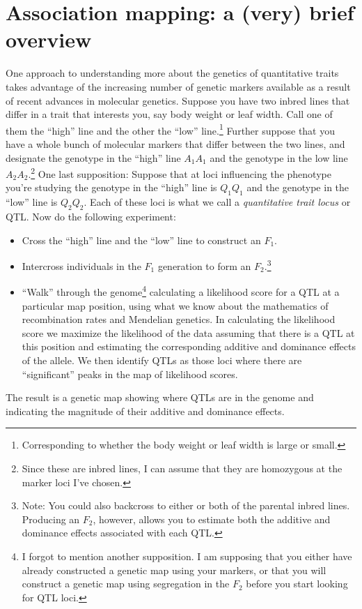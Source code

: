 \chapter{Association mapping: a (very) brief overview}

One approach to understanding more about the genetics of quantitative
traits takes advantage of the increasing number of genetic markers
available as a result of recent advances in molecular
genetics. Suppose you have two inbred lines that differ in a trait
that interests you, say body weight or leaf width. Call one of them
the ``high'' line and the other the ``low''
line.\footnote{Corresponding to whether the body weight or leaf width
  is large or small.} Further suppose that you have a whole bunch of
molecular markers that differ between the two lines, and designate the
genotype in the ``high'' line $A_1A_1$ and the genotype in the low
line $A_2A_2$.\footnote{Since these are inbred lines, I can assume
  that they are homozygous at the marker loci I've chosen.} One last
supposition: Suppose that at loci influencing the phenotype you're
studying the genotype in the ``high'' line is $Q_1Q_1$ and the
genotype in the ``low'' line is $Q_2Q_2$. Each of these loci is what
we call a {\it quantitative trait locus\/} or QTL. Now do the following experiment:

\begin{itemize}

\item Cross the ``high'' line and the ``low'' line to construct an
  $F_1$.

\item Intercross individuals in the $F_1$ generation to form an
  $F_2$.\footnote{Note: You could also backcross to either or both of
    the parental inbred lines. Producing an $F_2$, however, allows you
    to estimate both the additive and dominance effects associated
    with each QTL.}

\item ``Walk'' through the genome\footnote{I forgot to mention another
    supposition. I am supposing that you either have already
    constructed a genetic map using your markers, or that you will
    construct a genetic map using segregation in the $F_2$ before you
    start looking for QTL loci.} calculating a likelihood score for a
  QTL at a particular map position, using what we know about the
  mathematics of recombination rates and Mendelian genetics. In
  calculating the likelihood score we maximize the likelihood of the
  data assuming that there is a QTL at this position and estimating
  the corresponding additive and dominance effects of the allele. We
  then identify QTLs as those loci where there are ``significant''
  peaks in the map of likelihood scores.

\end{itemize}
The result is a genetic map showing where QTLs are in the genome and
indicating the magnitude of their additive and dominance effects.

